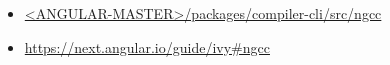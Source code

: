 





\begin{itemize}
  \item \href{https://github.com/angular/angular/tree/master/packages/compiler-cli/src/ngcc}
        {<ANGULAR-MASTER>/packages/compiler-cli/src/ngcc}
\end{itemize}




\begin{itemize}
  \item \url{https://next.angular.io/guide/ivy#ngcc}
\end{itemize}

